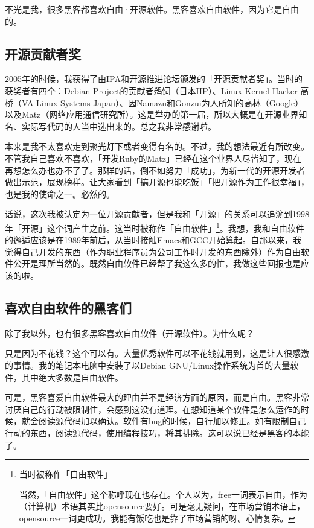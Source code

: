 \documentclass[a4paper,12pt]{article}
\begin{document}
不光是我，很多黑客都喜欢自由·开源软件。黑客喜欢自由软件，因为它是自由的。

\subsection{开源贡献者奖}

2005年的时候，我获得了由IPA和开源推进论坛颁发的「开源贡献者奖」。当时的获奖者有四个：Debian Project的贡献者鹈饲（日本HP）、Linux Kernel Hacker 高桥（VA Linux Systems Japan）、因Namazu和Gonzui为人所知的高林（Google）以及Matz（网络应用通信研究所）。这是举办的第一届，所以大概是在开源业界知名、实际写代码的人当中选出来的。总之我非常感谢啦。

本来是我不太喜欢走到聚光灯下或者变得有名的。不过，我的想法最近有所改变。不管我自己喜欢不喜欢，「开发Ruby的Matz」已经在这个业界人尽皆知了，现在再想怎么办也办不了了。那样的话，倒不如努力「成功」，为新一代的开源开发者做出示范，展现榜样。让大家看到「搞开源也能吃饭」「把开源作为工作很幸福」，也是我的使命之一。必然的。

话说，这次我被认定为一位开源贡献者，但是我和「开源」的关系可以追溯到1998年「开源」这个词产生之前。这当时被称作「自由软件」\footnote{当时被称作「自由软件」

当然，「自由软件」这个称呼现在也存在。个人以为，free一词表示自由，作为（计算机）术语其实比opensource要好。可是毫无疑问，在市场营销术语上，opensource一词更成功。我能有饭吃也是靠了市场营销的呀。心情复杂。}。我想，我和自由软件的邂逅应该是在1989年前后，从当时接触Emacs和GCC开始算起。自那以来，我觉得自己开发的东西（作为职业程序员为公司工作时开发的东西除外）作为自由软件公开是理所当然的。既然自由软件已经帮了我这么多的忙，我做这些回报也是应该的啦。

\subsection{喜欢自由软件的黑客们}

除了我以外，也有很多黑客喜欢自由软件（开源软件）。为什么呢？

只是因为不花钱？这个可以有。大量优秀软件可以不花钱就用到，这是让人很感激的事情。我的笔记本电脑中安装了以Debian GNU/Linux操作系统为首的大量软件，其中绝大多数是自由软件。

可是，黑客喜爱自由软件最大的理由并不是经济方面的原因，而是自由。黑客非常讨厌自己的行动被限制住，会感到这没有道理。在想知道某个软件是怎么运作的时候，就会阅读源代码加以确认。软件有bug的时候，自行加以修正。如有限制自己行动的东西，阅读源代码，使用编程技巧，将其排除。这可以说已经是黑客的本能了。
\end{document}
